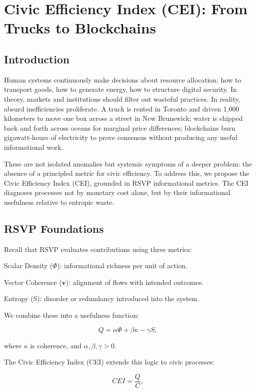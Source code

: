 \documentclass{book}
\begin{document}
\chapter{Civic Efficiency Index (CEI): From Trucks to Blockchains}

\section{Introduction}

Human systems continuously make decisions about resource allocation: how to transport goods, how to generate energy, how to structure digital security. In theory, markets and institutions should filter out wasteful practices. In reality, absurd inefficiencies proliferate. A truck is rented in Toronto and driven 1,000 kilometers to move one box across a street in New Brunswick; water is shipped back and forth across oceans for marginal price differences; blockchains burn gigawatt-hours of electricity to prove consensus without producing any useful informational work.

These are not isolated anomalies but systemic symptoms of a deeper problem: the absence of a principled metric for civic efficiency. To address this, we propose the Civic Efficiency Index (CEI), grounded in RSVP informational metrics. The CEI diagnoses processes not by monetary cost alone, but by their informational usefulness relative to entropic waste.

\section{RSVP Foundations}

Recall that RSVP evaluates contributions using three metrics:

Scalar Density (\(\Phi\)): informational richness per unit of action.

Vector Coherence (\(\mathbf{v}\)): alignment of flows with intended outcomes.

Entropy (S): disorder or redundancy introduced into the system.

We combine these into a usefulness function:

\[ Q = \alpha \Phi + \beta \kappa - \gamma S, \]

where \( \kappa \) is coherence, and \( \alpha, \beta, \gamma > 0 \).

The Civic Efficiency Index (CEI) extends this logic to civic processes:

\[ CEI = \frac{Q}{C}, \]
\end{document}
